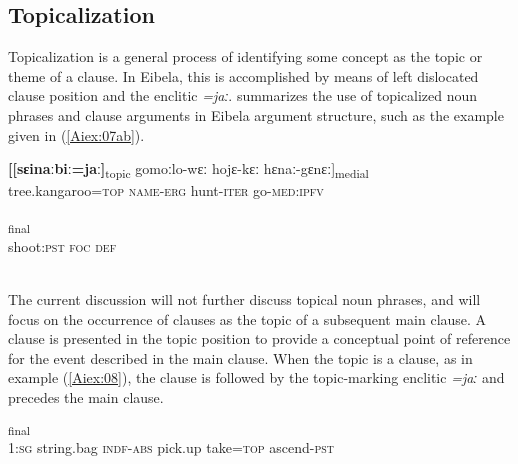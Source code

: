 \documentclass[output=paper]{LSP/langsci}
\begin{document}
\subsection{Topicalization} 
\label{AiTopicalization}
Topicalization is a general process of identifying some concept as the topic or theme of a clause.
In Eibela, this is accomplished by means of left dislocated clause position and the enclitic \textit{=jaː}. \citet{Aiton.2014} summarizes the use of topicalized noun phrases and clause arguments in Eibela argument
structure, such as the example given in (\ref{Aiex:07ab}).

\begin{exe}
\ex \label{Aiex:07ab}
\begin{xlist}
\ex \label{Aiex:07a}
\gll \textbf{[[sɛinaːbiː=jaː]}\textsubscript{topic}	gomoːlo-wɛː	hojɛ-kɛː	hɛnaː-gɛnɛː]\textsubscript{medial}\\
tree.kangaroo=\textsc{top}	\textsc{name}-\textsc{erg}	hunt-\textsc{iter}	go-\textsc{med}:\textsc{ipfv}\\
\glt {}\\
\ex \label{Aiex:07b}
\textsubscript{final}\\
shoot:\textsc{pst}	\textsc{foc}	\textsc{def}\\
\glt {}\\
\end{xlist}
\end{exe}

The current discussion will not further discuss topical noun phrases, and will focus on the occurrence of clauses as the topic of a subsequent main clause.
	A clause is presented in the topic position to provide a conceptual point of reference for the event described in the main clause. When the topic is a clause, as in example (\ref{Aiex:08}), the clause is followed by the topic-marking enclitic \textit{=jaː} and precedes the main clause.

\begin{exe}
\ex \label{Aiex:08}
\textsubscript{final}\\
1:\textsc{sg}	string.bag	\textsc{indf}-\textsc{abs}	pick.up	take=\textsc{top}	ascend-\textsc{pst}\\
\glt {}\\
\end{exe}
\end{document}

